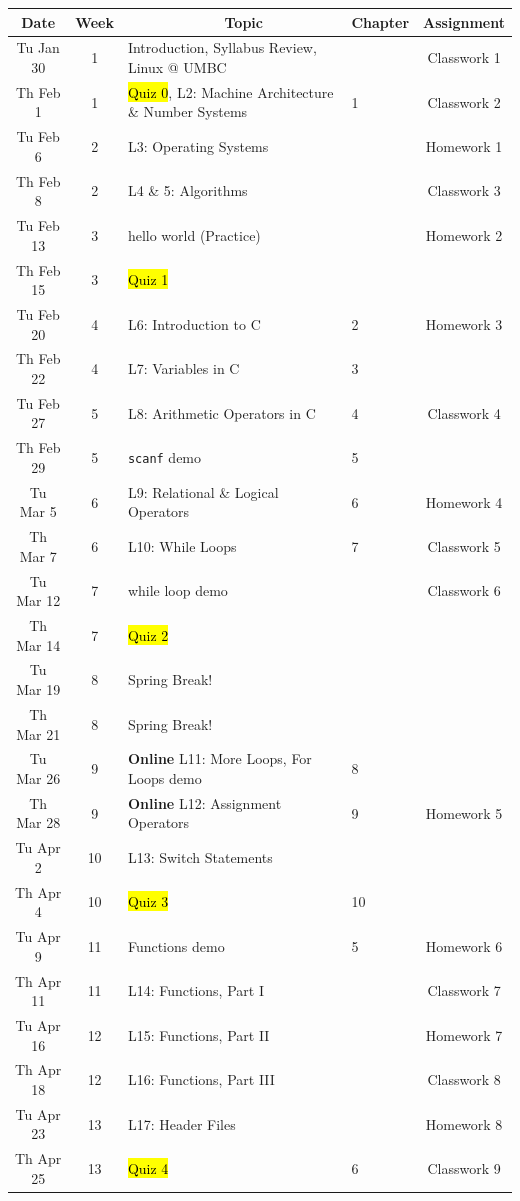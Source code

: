 \documentclass[letter,11pt]{article}
\begin{document}
\small
\begin{tabular}{c c l l c}
Date & Week & ~~~~~~~~~~~~Topic & Chapter & Assignment \\
\hline
Tu Jan 30  & 1 & Introduction, Syllabus Review, Linux @ UMBC & & Classwork 1  \\ \hline

Th Feb 1  & 1 & \hl{Quiz 0}, L2: Machine Architecture \& Number Systems & 1 & Classwork 2 \\
Tu Feb 6  & 2 & L3: Operating Systems & & Homework 1 \\
Th Feb 8 & 2 & L4 \& 5: Algorithms & & Classwork 3 \\
Tu Feb 13 & 3 & hello world (Practice) & & Homework 2 \\
Th Feb 15 & 3 & \hl{Quiz 1} & &  \\
Tu Feb 20 & 4 & L6: Introduction to C & 2 & Homework 3\\
Th Feb 22 & 4 & L7: Variables in C & 3 \\
Tu Feb 27 & 5 & L8: Arithmetic Operators in C & 4 & Classwork 4 \\
Th Feb 29 & 5 & \texttt{scanf} demo & 5 &  \\ \hline

Tu Mar 5 & 6 & L9: Relational \& Logical Operators & 6 & Homework 4 \\
Th Mar 7 & 6 & L10: While Loops & 7 & Classwork 5 \\
Tu Mar 12 & 7 & while loop demo & & Classwork 6 \\
Th Mar 14 & 7 & \hl{Quiz 2} & & \\
Tu Mar 19 & 8 & {\color{cadmiumgreen}Spring Break!} & & \\
Th Mar 21 & 8 & {\color{cadmiumgreen}Spring Break!} & &  \\
Tu Mar 26 & 9 & \textbf{Online} L11: More Loops, For Loops demo & 8 &  \\
Th Mar 28 & 9 & \textbf{Online} L12: Assignment Operators & 9 & Homework 5\\ \hline

Tu Apr 2 & 10 & L13: Switch Statements & & \\
Th Apr 4 & 10 & \hl{Quiz 3} & 10 & \\
Tu Apr 9 & 11 & Functions demo & 5 & Homework 6\\
Th Apr 11 & 11 & L14: Functions, Part I & & Classwork 7  \\
Tu Apr 16 & 12 & L15: Functions, Part II & &  Homework 7 \\
Th Apr 18 & 12 & L16: Functions, Part III  & & Classwork 8 \\
Tu Apr 23 & 13 & L17: Header Files & & Homework 8\\
Th Apr 25 & 13 & \hl{Quiz 4} & 6 & Classwork 9 \\ \hline


\end{tabular}
\end{document}
